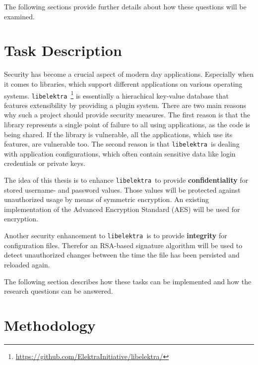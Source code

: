 \documentclass[a4paper]{article}
\newcommand{\libelektra}{\texttt{libelektra}~}
\begin{document}
The following sections provide further details about how these questions will be examined.


\section{Task Description}

Security has become a crucial aspect of modern day applications.
Especially when it comes to libraries, which support different applications on various operating systems.
\libelektra\footnote{\url{https://github.com/ElektraInitiative/libelektra/}} is essentially a hierachical key-value database that features extensibility by providing a plugin system.
There are two main reasons why such a project should provide security measures.
The first reason is that the library represents a single point of failure to all using applications, as the code is being shared.
If the library is vulnerable, all the applications, which use its features, are vulnerable too.
The second reason is that \libelektra is dealing with application configurations, which often contain sensitive data like login credentials or private keys.

The idea of this thesis is to enhance \libelektra to provide \textbf{confidentiality} for stored username- and password values.
Those values will be protected against unauthorized usage by means of symmetric encryption.
An existing implementation of the Advanced Encryption Standard (AES) will be used for encryption.

Another security enhancement to \libelektra is to provide \textbf{integrity} for configuration files.
Therefor an RSA-based signature algorithm will be used to detect unauthorized changes between the time the file has been persisted and reloaded again.

The following section describes how these tasks can be implemented and how the research questions can be answered.


\section{Methodology}
\end{document}

